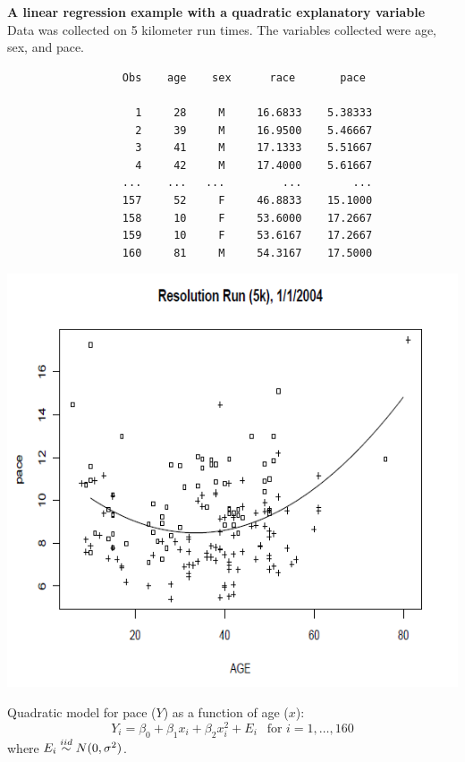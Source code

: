 \Large\textbf{A linear regression example with a quadratic explanatory variable}\large\\
Data was collected on 5 kilometer run times.  The variables collected were age, sex, and pace.\\
\begin{small}
\begin{verbatim}
                  Obs    age    sex      race       pace

                    1     28     M     16.6833    5.38333
                    2     39     M     16.9500    5.46667
                    3     41     M     17.1333    5.51667
                    4     42     M     17.4000    5.61667
                  ...    ...   ...         ...        ...
                  157     52     F     46.8833    15.1000
                  158     10     F     53.6000    17.2667
                  159     10     F     53.6167    17.2667
                  160     81     M     54.3167    17.5000

\end{verbatim}
\end{small}
\begin{center}
\includegraphics[scale=0.7]{res5k_quadratic}
\end{center}

Quadratic model for pace ($Y$) as a function of age ($x$):
$$ Y_i = \beta_0 + \beta_1 x_i + \beta_2 x_i^2 + E_i \ \ \mbox{ for }i=1,\ldots,160$$
where $E_i \stackrel{iid}{\sim} N(0,\sigma^2)$.

